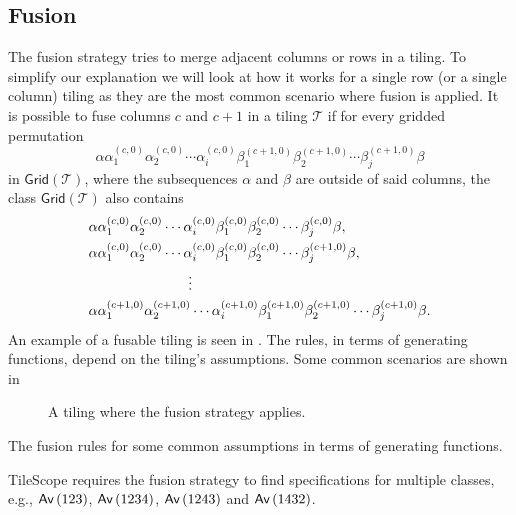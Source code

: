 \subsection{Fusion}
The fusion strategy tries to merge adjacent columns or rows in a tiling. To simplify our explanation we will look at how it works for a single row (or a single column) tiling as they are the most common scenario where fusion is applied. It is possible to fuse columns $c$ and $c+1$ in a tiling $\mathcal{T}$ if for every gridded permutation
\[
\alpha \alpha_1^{(c,0)}\alpha_2^{(c,0)}\dotsm\alpha_i^{(c,0)}\beta_1^{(c+1,0)}\beta_2^{(c+1,0)}\dotsm\beta_j^{(c+1,0)} \beta 
\]
in $\textsf{Grid}(\mathcal{T})$, where the subsequences $\alpha$ and $\beta$ are outside of said columns, the class $\textsf{Grid}(\mathcal{T})$ also contains
\begin{align*}
    &\alpha\alpha_1^{(c,0)}\alpha_2^{(c,0)}\dotsm\alpha_i^{(c,0)}\beta_1^{(c,0)}\beta_2^{(c,0)}\dotsm\beta_j^{(c,0)}\beta,\\
    &\alpha\alpha_1^{(c,0)}\alpha_2^{(c,0)}\dotsm\alpha_i^{(c,0)}\beta_1^{(c,0)}\beta_2^{(c,0)}\dotsm\beta_j^{(c+1,0)}\beta,\\
    &\hspace{2.5cm}\vdots\\
    &\alpha\alpha_1^{(c+1,0)}\alpha_2^{(c+1,0)}\dotsm\alpha_i^{(c+1,0)}\beta_1^{(c+1,0)}\beta_2^{(c+1,0)}\dotsm\beta_j^{(c+1,0)}\beta.
\end{align*}
An example of a fusable tiling is seen in . The rules, in terms of generating functions, depend on the tiling's assumptions. Some common scenarios are shown in 

\begin{figure}[ht!]
    \centering
    
    \caption{A tiling where the fusion strategy applies.}
    \label{fig:fusable}
\end{figure}

\begin{table}[ht!]
    \centering
    
    \caption{The fusion rules for some common assumptions in terms of generating functions.}
    \label{tab:fusegf}
\end{table}

TileScope requires the fusion strategy to find specifications for multiple classes, e.g., $\textsf{Av}\left(123\right)$, $\textsf{Av}\left(1234\right)$, $\textsf{Av}\left(1243\right)$ and $\textsf{Av}\left(1432\right)$.
